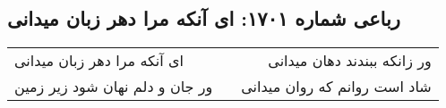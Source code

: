 \begin{center}
\section*{رباعی شماره ۱۷۰۱: ای آنکه مرا دهر زبان میدانی}
\label{sec:1701}
\begin{longtable}{l p{0.5cm} r}
ای آنکه مرا دهر زبان میدانی
&&
ور زانکه ببندند دهان میدانی
\\
ور جان و دلم نهان شود زیر زمین
&&
شاد است روانم که روان میدانی
\\
\end{longtable}
\end{center}
